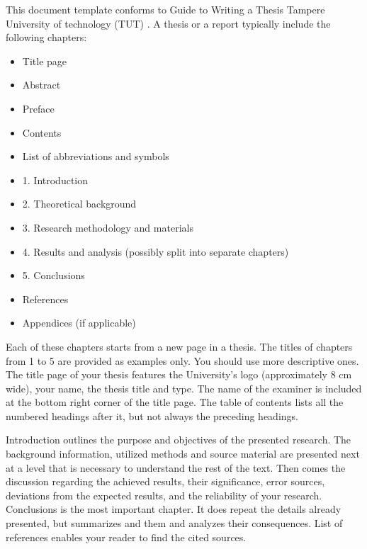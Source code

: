 \documentclass[12pt,a4paper,finnish]{tutthesis}
\begin{document}



This document template conforms to Guide to Writing a Thesis Tampere
University of technology (TUT) \cite{thesisguide13}. A thesis or a
report typically include the following chapters:
\begin{itemize}
  \setlength{\itemsep}{-10pt} %
\item[] Title page           %
\item[] Abstract
\item[] Preface
\item[] Contents
\item[] List of abbreviations and symbols
\item[] 1. Introduction
\item[] 2. Theoretical background
\item[] 3. Research methodology and materials
\item[] 4. Results and analysis (possibly split into separate chapters)
\item[] 5. Conclusions
\item[] References
\item[] Appendices (if applicable)
\end{itemize}


Each of these chapters starts from a new page in a thesis. The titles
of chapters from 1 to 5 are provided as examples only. You should use
more descriptive ones.  The title page of your thesis features the
University's logo (approximately 8 cm wide), your name, the thesis
title and type. The name of the examiner is included at the bottom
right corner of the title page. The table of contents lists all the
numbered headings after it, but not always the preceding headings.

Introduction outlines the purpose and objectives of the presented
research. The background information, utilized methods and source
material are presented next at a level that is necessary to understand
the rest of the text. Then comes the discussion regarding the achieved
results, their significance, error sources, deviations from the
expected results, and the reliability of your research. Conclusions is
the most important chapter. It does repeat the details already
presented, but summarizes and them and analyzes their
consequences. List of references enables your reader to find the cited
sources.
\end{document}
